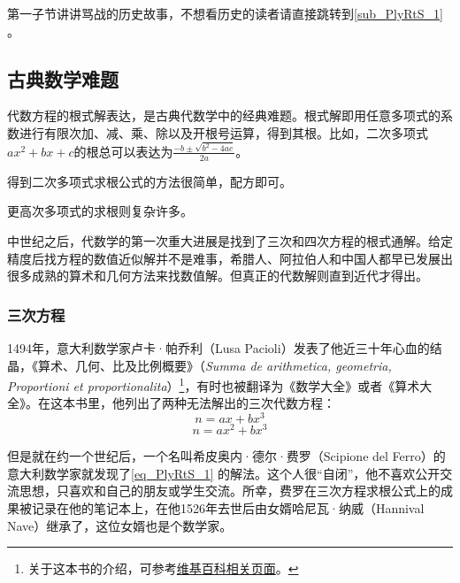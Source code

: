 




第一子节讲讲骂战的历史故事，不想看历史的读者请直接跳转到\autoref{sub_PlyRtS_1} 。

\subsection{古典数学难题}

代数方程的根式解表达，是古典代数学中的经典难题。根式解即用任意多项式的系数进行有限次加、减、乘、除以及开根号运算，得到其根。比如，二次多项式$ax^2+bx+c$的根总可以表达为$\frac{-b\pm\sqrt{b^2-4ac}}{2a}$。

得到二次多项式求根公式的方法很简单，配方即可。

更高次多项式的求根则复杂许多。

中世纪之后，代数学的第一次重大进展是找到了三次和四次方程的根式通解。给定精度后找方程的数值近似解并不是难事，希腊人、阿拉伯人和中国人都早已发展出很多成熟的算术和几何方法来找数值解。但真正的代数解则直到近代才得出。

\subsubsection{三次方程}

1494年，意大利数学家卢卡·帕乔利（Lusa Pacioli）发表了他近三十年心血的结晶，《算术、几何、比及比例概要》（\textsl{Summa de arithmetica, geometria, Proportioni et proportionalita}）\footnote{关于这本书的介绍，可参考\href{https://en.wikipedia.org/wiki/Summa_de_arithmetica}{维基百科相关页面}。}，有时也被翻译为《数学大全》或者《算术大全》。在这本书里，他列出了两种无法解出的三次代数方程：
\begin{equation}\label{eq_PlyRtS_1}
n=ax+bx^3
\end{equation}
\begin{equation}\label{eq_PlyRtS_2}
n=ax^2+bx^3
\end{equation}

但是就在约一个世纪后，一个名叫希皮奥内·德尔·费罗（Scipione del Ferro）的意大利数学家就发现了\autoref{eq_PlyRtS_1} 的解法。这个人很“自闭”，他不喜欢公开交流思想，只喜欢和自己的朋友或学生交流。所幸，费罗在三次方程求根公式上的成果被记录在他的笔记本上，在他1526年去世后由女婿哈尼瓦·纳威（Hannival Nave）继承了，这位女婿也是个数学家。

